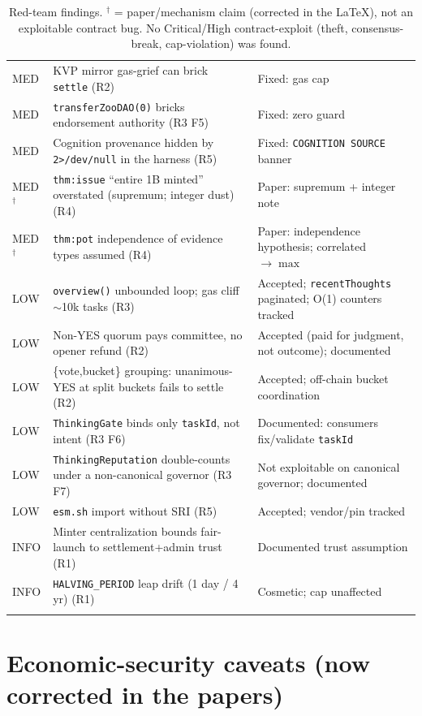\documentclass[11pt]{article}
\begin{document}
\begin{longtable}{@{}p{1.1cm}p{8.4cm}p{4.0cm}@{}}
MED & KVP mirror gas-grief can brick \texttt{settle} (R2) & Fixed: gas cap \\
MED & \texttt{transferZooDAO(0)} bricks endorsement authority (R3 F5) & Fixed: zero guard \\
MED & Cognition provenance hidden by \texttt{2>/dev/null} in the harness (R5) & Fixed: \texttt{COGNITION SOURCE} banner \\
MED$^\dagger$ & \texttt{thm:issue} ``entire 1B minted'' overstated (supremum; integer dust) (R4) & Paper: supremum + integer note \\
MED$^\dagger$ & \texttt{thm:pot} independence of evidence types assumed (R4) & Paper: independence hypothesis; correlated $\to\max$ \\
LOW & \texttt{overview()} unbounded loop; gas cliff $\sim$10k tasks (R3) & Accepted; \texttt{recentThoughts} paginated; O(1) counters tracked \\
LOW & Non-YES quorum pays committee, no opener refund (R2) & Accepted (paid for judgment, not outcome); documented \\
LOW & \{vote,bucket\} grouping: unanimous-YES at split buckets fails to settle (R2) & Accepted; off-chain bucket coordination \\
LOW & \texttt{ThinkingGate} binds only \texttt{taskId}, not intent (R3 F6) & Documented: consumers fix/validate \texttt{taskId} \\
LOW & \texttt{ThinkingReputation} double-counts under a non-canonical governor (R3 F7) & Not exploitable on canonical governor; documented \\
LOW & \texttt{esm.sh} import without SRI (R5) & Accepted; vendor/pin tracked \\
INFO & Minter centralization bounds fair-launch to settlement+admin trust (R1) & Documented trust assumption \\
INFO & \texttt{HALVING\_PERIOD} leap drift (1 day / 4 yr) (R1) & Cosmetic; cap unaffected \\
\bottomrule
\caption{Red-team findings. $^\dagger$ = paper/mechanism claim (corrected in the
LaTeX), not an exploitable contract bug. No Critical/High contract-exploit
(theft, consensus-break, cap-violation) was found.}
\end{longtable}

\section{Economic-security caveats (now corrected in the papers)}
\label{sec:econ}
\end{document}
